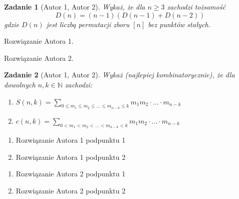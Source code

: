 \documentclass{mwart}
\newtheorem{zad}{Zadanie}[section]
\begin{document}
\begin{zad}[Autor 1, Autor 2]
    Wykaż, że dla $n \geq 3$ zachodzi tożsamość
    \[
        D(n) = (n-1)(D(n-1) + D(n-2))
    \]
    gdzie $D(n)$ jest liczbą permutacji zboru $[n]$ bez punktów stałych.
\end{zad}
\begin{mdframed}
    Rozwiązanie Autora 1.
\end{mdframed}
\begin{mdframed}
    Rozwiązanie Autora 2.
\end{mdframed}




\begin{zad}[Autor 1, Autor 2]
    Wykaż (najlepiej kombinatorycznie), że dla dowolnych $n, k \in \mathbb{N}$
    zachodzi:
    \begin{enumerate}
        \item $S(n, k) = \sum_{0 \leq m_1 \leq m_2 \leq ... \leq m_{n-k} \leq k} m_1m_2 \cdot ... \cdot m_{n-k}$
        \item $c(n, k) = \sum_{0 < m_1 < m_2 < ... < m_{n-k} < k} m_1m_2 \cdot ... \cdot m_{n-k}$
    \end{enumerate}
\end{zad}
\begin{mdframed}
    \begin{enumerate}
        \item Rozwiązanie Autora 1 podpunktu 1
        \item Rozwiązanie Autora 1 podpunktu 2
    \end{enumerate}
\end{mdframed}
\begin{mdframed}
    \begin{enumerate}
        \item Rozwiązanie Autora 2 podpunktu 1
        \item Rozwiązanie Autora 2 podpunktu 2
    \end{enumerate}
\end{mdframed}
\end{document}
